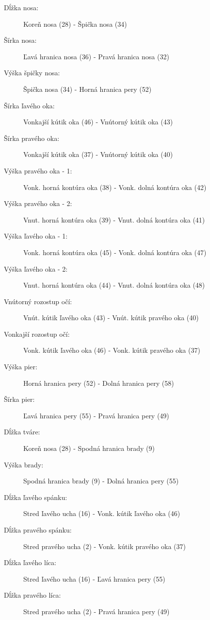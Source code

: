 \begin{description}
	\item[Dĺžka nosa:] Koreň nosa (28) - Špička nosa (34)
	\item[Šírka nosa:] Ľavá hranica nosa (36) - Pravá hranica nosa (32)
	\item[Výška špičky nosa:] Špička nosa (34) - Horná hranica pery (52)
	\item[Šírka ľavého oka:] Vonkajší kútik oka (46) - Vnútorný kútik oka (43)
	\item[Šírka pravého oka:] Vonkajší kútik oka (37) - Vnútorný kútik oka (40)
	\item[Výška pravého oka - 1:] Vonk. horná kontúra oka (38) - Vonk. dolná kontúra oka (42)
	\item[Výška pravého oka - 2:] Vnut. horná kontúra oka (39) - Vnut. dolná kontúra oka (41)
	\item[Výška ľavého oka - 1:] Vonk. horná kontúra oka (45) - Vonk. dolná kontúra oka (47)
	\item[Výška ľavého oka - 2:] Vnut. horná kontúra oka (44) - Vnut. dolná kontúra oka (48)
	\item[Vnútorný rozostup očí:] Vnút. kútik ľavého oka (43) - Vnút. kútik pravého oka (40)
	\item[Vonkajší rozostup očí:] Vonk. kútik ľavého oka (46) - Vonk. kútik pravého oka (37)
	\item[Výška pier:] Horná hranica pery (52) - Dolná hranica pery (58)
	\item[Šírka pier:] Ľavá hranica pery (55) - Pravá hranica pery (49)
	\item[Dĺžka tváre:] Koreň nosa (28) - Spodná hranica brady (9)
	\item[Výška brady:] Spodná hranica brady (9) - Dolná hranica pery (55)
	\item[Dĺžka ľavého spánku:] Stred ľavého ucha (16) - Vonk. kútik ľavého oka (46)
	\item[Dĺžka pravého spánku:] Stred pravého ucha (2) - Vonk. kútik pravého oka (37)
	\item[Dĺžka ľavého líca:] Stred ľavého ucha (16) - Ľavá hranica pery (55)
	\item[Dĺžka pravého líca:] Stred pravého ucha (2) - Pravá hranica pery (49)
	
	
\end{description}





